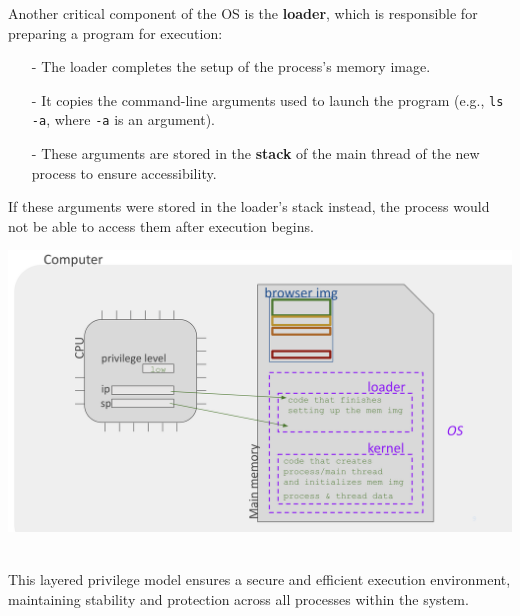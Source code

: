 Another critical component of the OS is the \textbf{loader}, which is responsible for preparing a program for execution: \\
\begin{minipage}{0.45\textwidth}
\begin{itemize}
    \item[-] The loader completes the setup of the process's memory image.
    \item[-] It copies the command-line arguments used to launch the program (e.g., \texttt{ls -a}, where \texttt{-a} is an argument).
    \item[-] These arguments are stored in the \textbf{stack} of the main thread of the new process to ensure accessibility.
\end{itemize}
\end{minipage} \hfill \vline \hfill 
\begin{minipage}{0.45\textwidth}
If these arguments were stored in the loader's stack instead, the process would not be able to access them after execution begins.
\begin{center}
    \includegraphics[width=1.1\textwidth]{chapters/L3/images/kernel.png}
\end{center}
\end{minipage} \\[10px]

This layered privilege model ensures a secure and efficient execution environment, maintaining stability and protection across all processes within the system.

